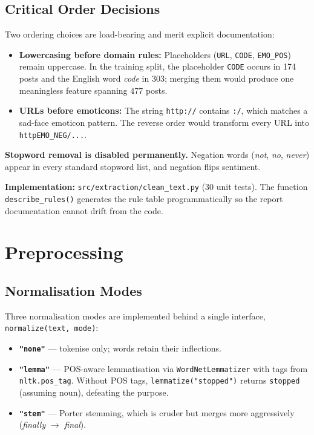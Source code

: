 \documentclass[11pt,a4paper]{article}
\begin{document}
\subsection{Critical Order Decisions}

Two ordering choices are load-bearing and merit explicit documentation:

\begin{itemize}[leftmargin=*]
    \item \textbf{Lowercasing before domain rules:} Placeholders (\texttt{URL}, \texttt{CODE}, \texttt{EMO\_POS}) remain uppercase. In the training split, the placeholder \texttt{CODE} occurs in 174 posts and the English word \textit{code} in 303; merging them would produce one meaningless feature spanning 477 posts.
    \item \textbf{URLs before emoticons:} The string \texttt{http://} contains \texttt{:/}, which matches a sad-face emoticon pattern. The reverse order would transform every URL into \texttt{httpEMO\_NEG/...}.
\end{itemize}

\textbf{Stopword removal is disabled permanently.} Negation words (\textit{not}, \textit{no}, \textit{never}) appear in every standard stopword list, and negation flips sentiment.

\textbf{Implementation:} \texttt{src/extraction/clean\_text.py} (30 unit tests). The function \texttt{describe\_rules()} generates the rule table programmatically so the report documentation cannot drift from the code.

\section{Preprocessing}
\label{sec:preprocessing}

\subsection{Normalisation Modes}

Three normalisation modes are implemented behind a single interface, \texttt{normalize(text, mode)}:

\begin{itemize}[leftmargin=*]
    \item \textbf{\texttt{"none"}} --- tokenise only; words retain their inflections.
    \item \textbf{\texttt{"lemma"}} --- POS-aware lemmatisation via \texttt{WordNetLemmatizer} with tags from \texttt{nltk.pos\_tag}. Without POS tags, \texttt{lemmatize("stopped")} returns \texttt{stopped} (assuming noun), defeating the purpose.
    \item \textbf{\texttt{"stem"}} --- Porter stemming, which is cruder but merges more aggressively (\textit{finally} $\rightarrow$ \textit{final}).
\end{itemize}
\end{document}
